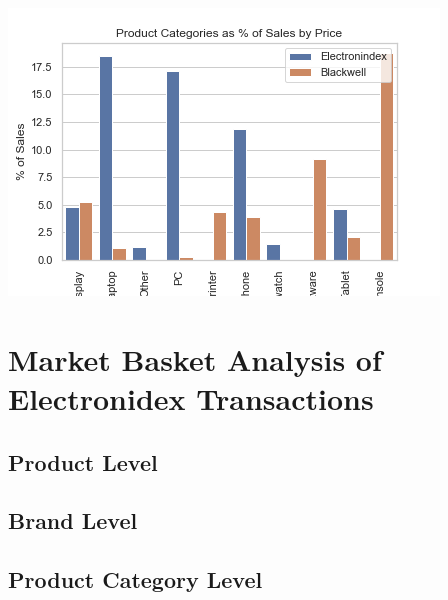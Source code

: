 \documentclass[12pt,a4paper,leqno]{report}
\theoremstyle{plain}
\theoremstyle{definition}
\theoremstyle{remark}
\begin{document}
\bigskip
{
    \centering
    \includegraphics[width=\textwidth,height=\textheight,keepaspectratio]{sales_distribution_of_product_categories_by_price_no_accessories.png}
    \par
}
\bigskip

\section{Market Basket Analysis of Electronidex Transactions}

\subsection{Product Level}

\subsection{Brand Level}

\subsection{Product Category Level}
\end{document}
